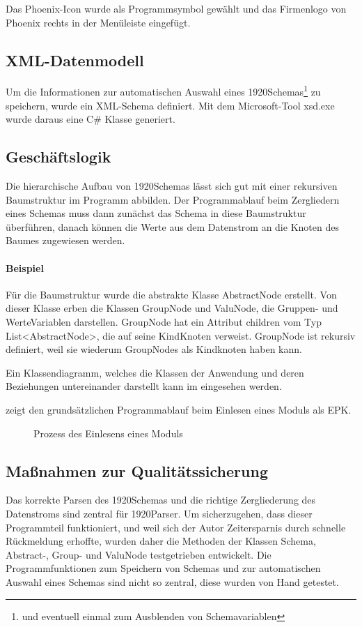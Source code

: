 Das Phoenix-Icon wurde als Programmsymbol gewählt und das Firmenlogo von Phoenix rechts in der Menüleiste eingefügt.

\subsection{XML-Datenmodell}
Um die Informationen zur automatischen Auswahl eines 1920Schemas\footnote{und eventuell einmal zum Ausblenden von Schemavariablen} zu speichern, wurde ein XML-Schema definiert. Mit dem Microsoft-Tool xsd.exe wurde daraus eine C\# Klasse generiert.

\subsection{Geschäftslogik}
\label{sec:Geschaeftslogik}
Die hierarchische Aufbau von 1920Schemas lässt sich gut mit einer rekursiven Baumstruktur im Programm abbilden. Der Programmablauf beim Zergliedern eines Schemas muss dann zunächst das Schema in diese Baumstruktur überführen, danach können die Werte aus dem Datenstrom an die Knoten des Baumes zugewiesen werden.

\paragraph{Beispiel}
Für die Baumstruktur wurde die abstrakte Klasse AbstractNode erstellt. Von dieser Klasse erben die Klassen GroupNode und ValuNode, die Gruppen- und WerteVariablen darstellen. GroupNode hat ein Attribut children vom Typ List<AbstractNode>, die auf seine KindKnoten verweist. GroupNode ist rekursiv definiert, weil sie wiederum GroupNodes als Kindknoten haben kann.

Ein Klassendiagramm, welches die Klassen der Anwendung und deren Beziehungen untereinander darstellt kann im  eingesehen werden.

 zeigt den grundsätzlichen Programmablauf beim Einlesen eines Moduls als \ac{EPK}.
\begin{figure}[htb]
\centering
{}
\caption{Prozess des Einlesens eines Moduls}
\label{fig:Modulimport}
\end{figure}


\subsection{Maßnahmen zur Qualitätssicherung}
\label{sec:Qualitaetssicherung}
Das korrekte Parsen des 1920Schemas und die richtige Zergliederung des Datenstroms sind zentral für 1920Parser. Um sicherzugehen, dass dieser Programmteil funktioniert, und weil sich der Autor Zeitersparnis durch schnelle Rückmeldung erhoffte, wurden daher die Methoden der Klassen Schema, Abstract-, Group- und ValuNode testgetrieben entwickelt.
Die Programmfunktionen zum Speichern von Schemas und zur automatischen Auswahl eines Schemas sind nicht so zentral, diese wurden von Hand getestet.


